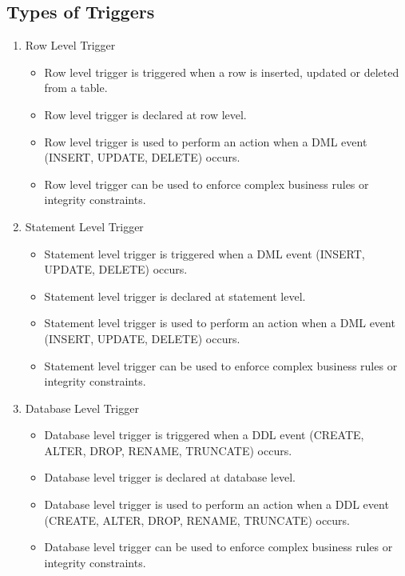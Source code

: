 \documentclass[11pt]{article}
\begin{document}
\subsection{Types of Triggers}
\begin{enumerate}
    \item Row Level Trigger
          \begin{itemize}
              \item Row level trigger is triggered when a row is inserted, updated or deleted from a table.
              \item Row level trigger is declared at row level.
              \item Row level trigger is used to perform an action when a DML event (INSERT, UPDATE, DELETE) occurs.
              \item Row level trigger can be used to enforce complex business rules or integrity constraints.
          \end{itemize}

    \item Statement Level Trigger
          \begin{itemize}
              \item Statement level trigger is triggered when a DML event (INSERT, UPDATE, DELETE) occurs.
              \item Statement level trigger is declared at statement level.
              \item Statement level trigger is used to perform an action when a DML event (INSERT, UPDATE, DELETE) occurs.
              \item Statement level trigger can be used to enforce complex business rules or integrity constraints.
          \end{itemize}

    \item Database Level Trigger
          \begin{itemize}
              \item Database level trigger is triggered when a DDL event (CREATE, ALTER, DROP, RENAME, TRUNCATE) occurs.
              \item Database level trigger is declared at database level.
              \item Database level trigger is used to perform an action when a DDL event (CREATE, ALTER, DROP, RENAME, TRUNCATE) occurs.
              \item Database level trigger can be used to enforce complex business rules or integrity constraints.
          \end{itemize}


\end{enumerate}
\end{document}
